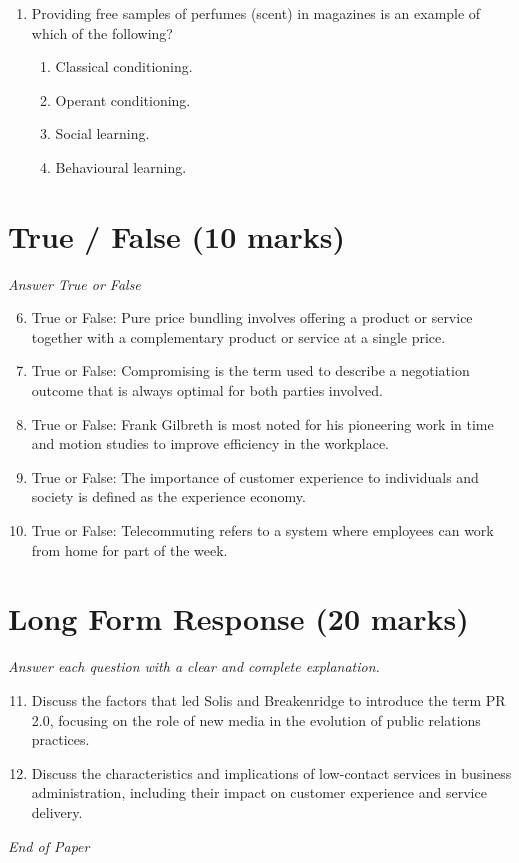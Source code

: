 \documentclass[12pt]{article}
\begin{document}
\begin{enumerate}[label=\arabic*.]
\begin{enumerate}[label=(\alph*)]
    \item Reputation
    \item Impact
    \item Familiarity with subject or issue
    \item Ability to reach people
\end{enumerate}
\item Providing free samples of perfumes (scent) in magazines is an example of which of the following?
\begin{enumerate}[label=(\alph*)]
    \item Classical conditioning.
    \item Operant conditioning.
    \item Social learning.
    \item Behavioural learning.
\end{enumerate}
\end{enumerate}

\section*{True / False (10 marks)}
\textit{Answer True or False}
\begin{enumerate}[label=\arabic*.]
\setcounter{enumi}{5}
\item True or False: Pure price bundling involves offering a product or service together with a complementary product or service at a single price.
\item True or False: Compromising is the term used to describe a negotiation outcome that is always optimal for both parties involved.
\item True or False: Frank Gilbreth is most noted for his pioneering work in time and motion studies to improve efficiency in the workplace.
\item True or False: The importance of customer experience to individuals and society is defined as the experience economy.
\item True or False: Telecommuting refers to a system where employees can work from home for part of the week.
\end{enumerate}

\section*{Long Form Response (20 marks)}
\textit{Answer each question with a clear and complete explanation.}
\begin{enumerate}[label=\arabic*.]
\setcounter{enumi}{10}
\item Discuss the factors that led Solis and Breakenridge to introduce the term PR 2.0, focusing on the role of new media in the evolution of public relations practices.
\item Discuss the characteristics and implications of low-contact services in business administration, including their impact on customer experience and service delivery.
\end{enumerate}

\vfill
\noindent\textit{End of Paper}
\end{document}
